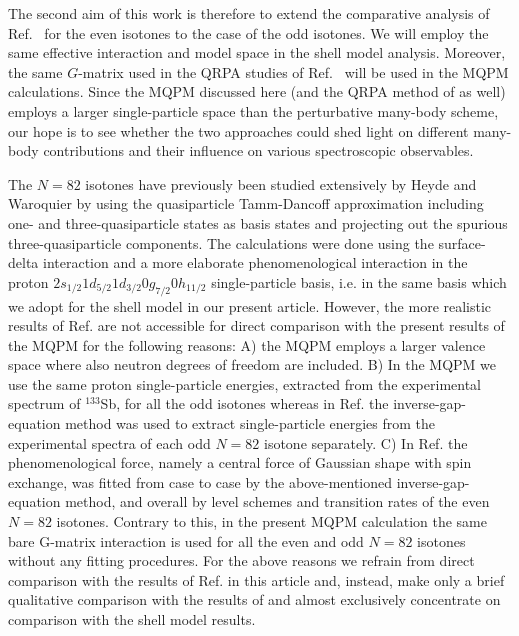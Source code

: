 The second aim of this work is therefore to extend the comparative 
analysis of Ref.\ \cite{HOL97}
for the even isotones to the case of the odd isotones. 
We will employ the
same effective interaction and model space in the shell model analysis. 
Moreover,
the same $G$-matrix used in the QRPA studies of Ref.\ \cite{HOL97} 
will be used in the MQPM calculations.  
Since the MQPM 
discussed here (and the QRPA method of \cite{HOL97} as well)   
employs a larger single-particle 
space than the perturbative many-body scheme, 
our hope is to see whether  the two approaches 
could shed light on different many-body contributions and 
their influence on various 
spectroscopic observables.

The $N=82$ isotones have previously been studied extensively by Heyde
and Waroquier \cite{WAR70,HEY71} by using the quasiparticle Tamm-Dancoff 
approximation including one- and three-quasiparticle states as basis
states and projecting out the spurious three-quasiparticle components.
The calculations were done using the surface-delta interaction
\cite{WAR70} and a more elaborate phenomenological interaction
\cite{HEY71} in the proton $2s_{1/2}1d_{5/2}1d_{3/2}0g_{7/2}0h_{11/2}$ 
single-particle basis, i.e. in the same basis which we adopt for the
shell model in our present article. However, the more realistic
results of Ref. \cite{HEY71} are not accessible for direct comparison with
the present results of the MQPM for the following reasons: A) the MQPM
employs a larger valence space where also neutron degrees of freedom
are included. B) In the MQPM we use the same proton single-particle
energies, extracted from the experimental spectrum of $^{133}$Sb, for
all the odd isotones whereas in Ref. \cite{HEY71} the inverse-gap-equation
method was used to extract single-particle energies from the 
experimental spectra of each odd $N=82$ isotone separately. C) In
Ref. \cite{HEY71} the phenomenological force, namely a central force of
Gaussian shape with spin exchange, was fitted from case to case by
the above-mentioned inverse-gap-equation method, and overall by level
schemes and transition rates of the even $N=82$ isotones. 
Contrary to this, in the present MQPM calculation the same bare 
G-matrix interaction is used for all the even and odd $N=82$ isotones
without any fitting procedures. For the above reasons we refrain from
direct comparison with the results of Ref. \cite{HEY71} in this article
and, instead, make only a brief qualitative comparison with the results
of \cite{HEY71} and almost exclusively
concentrate on comparison with the shell model results.
 
